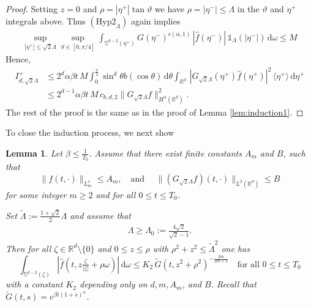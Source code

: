 \documentclass[11pt,a4paper,reqno]{amsart}
\theoremstyle{plain}
\newtheorem{lemma}[proposition]{Lemma}
\theoremstyle{definition}
\begin{document}
\begin{proof}
	Setting $z=0$ and $\rho= |\eta^+|\tan\vartheta$ we have $\rho=|\eta^-|\le \Lambda$ in the $\vartheta$ and $\eta^+$ integrals above. Thus
	  $(\mathrm{Hyp2}_{\Lambda})$ again implies
  \begin{align*}
 	\sup_{|\eta^+|\le \sqrt{2}\Lambda}\sup_{\vartheta\in [0,\pi/4]}
 	\int_{{\mathbb{S}}^{d-2}(\eta^+)}  G(\eta^-)^{\epsilon\left(\alpha, 1\right)}\,|\hat{f}(\eta^-)| \, {\mathds{1}}_{\Lambda}(|\eta^-|)\,\mathrm{d}\omega
 	\le M
 \end{align*}
Hence,
	\begin{align*}
		I_{d,\sqrt{2}\Lambda}^+ &\leq 2^{d} \alpha \beta t \, M \int_0^{\frac{\pi}{2}} \sin^d\theta b(\cos\theta)\, \mathrm{d}\theta  \int_{{\mathbb{R}}^d} \,|G_{\sqrt{2}\Lambda}(\eta^+) \hat{f}(\eta^+)|^2 \, \langle \eta^+ \rangle\,\mathrm{d}\eta^+ \\
		&\leq 2^{d-1} \alpha \beta t \, M \, c_{b,d,2} \|G_{\sqrt{2}\Lambda}f\|_{H^{\alpha}({\mathbb{R}}^d)}^2.
	\end{align*}
	The rest of the proof is the same as in the proof of Lemma \ref{lem:induction1}.
\end{proof}

To close the induction process, we next show
\begin{lemma}\label{lem:induction2-2}
	    	Let $\beta\leq \frac{1}{T_0}$.     	Assume that there exist finite constants $A_m$ and $B$, such that
    	\begin{equation}\label{eq:ind2-assumption1-2}
    	\|f(t, \cdot)\|_{L^1_m} \leq A_m , \quad  \text{and } \quad 	\| (G_{\sqrt{2}\Lambda} f)(t, \cdot) \|_{L^2({\mathbb{R}}^d)} \le B
    	\end{equation}
    	for some integer $m\geq 2$ and for all $0\le t\le T_0$.
    	
	Set $\widetilde{\Lambda}:= \frac{1+\sqrt{2}}{2} \Lambda$
		and assume that
	\begin{align}\label{eq:ind2-2-assumption2}
		\Lambda\ge \Lambda_0 := \frac{4 \sqrt{2}}{\sqrt{2}-1} .
	\end{align}
Then for all $\zeta\in{\mathbb{R}}^d\setminus\{0\}$ and $0\leq z \leq \rho$ with $\rho^2 + z^2 \leq \widetilde{\Lambda}^2$ one has
    	\begin{equation*}
    		\int_{{\mathbb{S}}^{d-2}(\zeta)} \left|\hat{f}\left(t,z \tfrac{\zeta}{|\zeta|} + \rho \omega\right)\right|\,\mathrm{d}\omega \leq K_2 \, \widetilde{G}(t,z^2+ \rho^2 )^{-\frac{2m}{2m+2}} \quad \text{for all } 0\le t\le T_0
    	\end{equation*}
		 with a constant $K_2$ depending only on $d,m,A_m$, and $B$. Recall that
		 $\widetilde{G}(t, s) = e^{\beta t (1+s)^\alpha}$.
\end{lemma}
\end{document}
